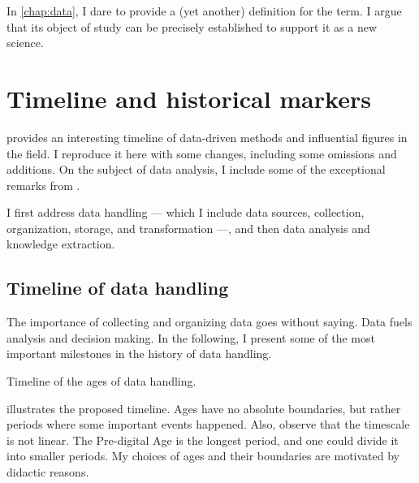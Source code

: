 In \cref{chap:data}, I dare to provide a (yet another) definition for the term.  I
argue that its object of study can be precisely established to support it as a new
science.

\section{Timeline and historical markers}

\textcite{Kelleher2018} provides an interesting timeline of data-driven methods and
influential figures in the field.  I reproduce it here with some changes, including
some omissions and additions.  On the subject of data analysis, I include some of the
exceptional remarks
from \textcite{Vapnik1999b}.

I first address data handling --- which I include data sources, collection, organization,
storage, and transformation ---, and then data analysis and knowledge extraction.

\subsection{Timeline of data handling}
\label{sub:time-handling}

The importance of collecting and organizing data goes without saying.  Data fuels analysis and
decision making.  In the following, I present some of the most important milestones in the history
of data handling.

\begin{figurebox}[label=fig:data-handling-history]{Timeline of the ages of data handling.}
  \centering
\end{figurebox}

 illustrates the proposed timeline.  Ages have no absolute
boundaries, but rather periods where some important events happened.  Also, observe that
the timescale is not linear.  The Pre-digital Age is the longest period, and one could
divide it into smaller periods.  My choices of ages and their boundaries are motivated by
didactic reasons.

